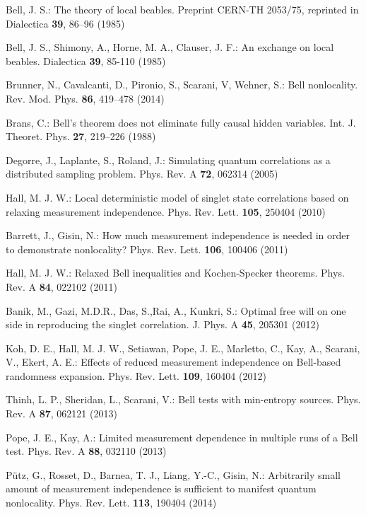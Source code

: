 \documentclass[graybox]{svmult}
\begin{document}
{\begin{thebibliography}{99}
 Bell, J. S.: The theory of local beables. Preprint CERN-TH 2053/75, reprinted in Dialectica {\bf 39}, 86--96 (1985)

 Bell, J. S., Shimony, A., Horne, M. A., Clauser, J. F.: An exchange on local beables. Dialectica {\bf 39}, 85-110 (1985)

 Brunner, N., Cavalcanti, D., Pironio, S., Scarani, V, Wehner, S.: Bell nonlocality.  Rev. Mod. Phys. {\bf 86}, 419--478 (2014)
		
 Brans, C.: Bell's theorem does not eliminate fully causal hidden variables.  Int. J. Theoret. Phys. \textbf{27}, 219--226 (1988)

 Degorre, J., Laplante, S., Roland, J.: Simulating quantum correlations as a distributed sampling problem. Phys. Rev. A {\bf 72}, 062314 (2005)

 Hall, M. J. W.: Local deterministic model of singlet state correlations based on relaxing measurement independence. Phys. Rev. Lett. {\bf 105}, 250404  (2010)
	
 Barrett, J., Gisin, N.: How much measurement independence is needed in order to demonstrate nonlocality? Phys. Rev. Lett. {\bf 106}, 100406 (2011)
	
 Hall, M. J. W.: Relaxed Bell inequalities and Kochen-Specker theorems. Phys. Rev. A {\bf 84}, 022102 (2011)

 Banik, M., Gazi, M.D.R., Das, S.,Rai, A., Kunkri, S.: Optimal free will on one side in reproducing the singlet correlation. J. Phys. A {\bf 45}, 205301 (2012)

Koh, D. E., Hall, M. J. W., Setiawan, Pope, J. E., Marletto, C., Kay, A., Scarani, V., Ekert, A. E.: Effects of reduced measurement independence on Bell-based randomness expansion. Phys. Rev. Lett. {\bf 109}, 160404 (2012)

 Thinh, L. P., Sheridan, L., Scarani, V.: Bell tests with min-entropy sources. Phys. Rev. A {\bf 87}, 062121 (2013)

 Pope, J. E., Kay, A.: Limited measurement dependence in multiple runs of a Bell test. Phys. Rev. A {\bf 88}, 032110 (2013)

 P\"utz, G., Rosset, D., Barnea, T. J., Liang, Y.-C., Gisin, N.: Arbitrarily small amount of measurement independence is sufficient to manifest quantum nonlocality. Phys. Rev. Lett. {\bf 113}, 190404 (2014)	


\end{thebibliography}}
\end{document}
